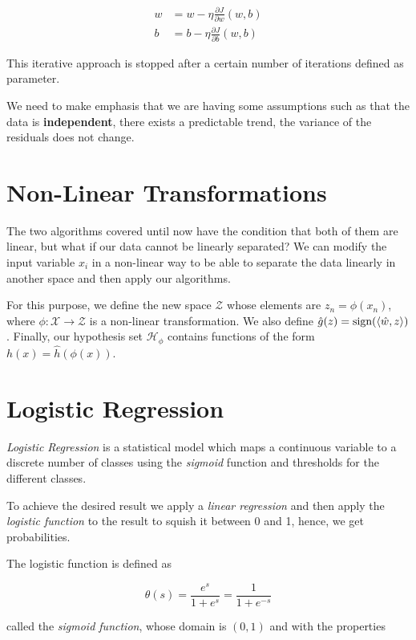 \begin{align*}
	w & = w - \eta \frac{\partial J}{\partial w}(w,b) \\
	b & = b - \eta \frac{\partial J}{\partial b}(w,b)
\end{align*}

This iterative approach is stopped after a certain number of iterations defined as parameter.

We need to make emphasis that we are having some assumptions such as that the data is \textbf{independent}, there exists a predictable trend,
the variance of the residuals does not change.

\section{Non-Linear Transformations}

The two algorithms covered until now have the condition that both of them are linear, but
what if our data cannot be linearly separated? We can modify the input variable \(x_i\)
in a non-linear way to be able to separate the data linearly in another space and then apply our algorithms.

For this purpose, we define the new space \(\mathcal{Z}\) whose elements are \(z_n = \phi(x_n)\), where
\(\phi: \mathcal{X} \to \mathcal{Z}\) is a non-linear transformation. We also define \(\hat{g}(z) = \text{sign}(\left\langle\hat{w}, z\right\rangle)\).
Finally, our hypothesis set \(\mathcal{H}_{\phi}\) contains functions of the form \(h(x) = \hat{h}(\phi(x))\).

\section{Logistic Regression}

\emph{Logistic Regression} is a statistical model which maps a continuous variable to a discrete number of classes using the \emph{sigmoid} function 
and thresholds for the different classes. 

To achieve the desired result we apply a \emph{linear regression} and then apply the \emph{logistic function} to the result to
squish it between 0 and 1,  hence, we get probabilities.

The logistic function is defined as

\[
	\theta(s) = \frac{e^s}{1 + e^s} = \frac{1}{1 + e^{-s}}
\]

called the \emph{sigmoid function}, whose domain is \((0, 1)\) and with the properties

